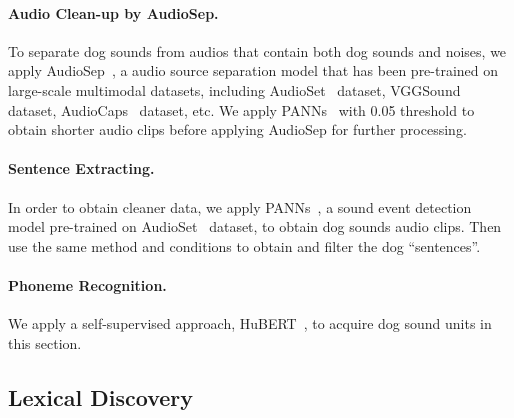 \paragraph{Audio Clean-up by AudioSep.} To separate dog sounds from audios that contain both dog sounds and noises, we apply AudioSep~\citep{liu2023separate}, a audio source separation model that has been pre-trained on large-scale multimodal datasets, including AudioSet~\citep{gemmeke2017audio} dataset, VGGSound~\citep{chen2020vggsound} dataset, AudioCaps~\citep{kim2019audiocaps} dataset, etc. We apply PANNs~\citep{kong2020panns} with 0.05 threshold to obtain shorter audio clips before applying AudioSep for further processing.

\paragraph{Sentence Extracting.} In order to obtain cleaner data, we apply PANNs~\citep{kong2020panns}, a sound event detection model pre-trained on AudioSet~\citep{gemmeke2017audio} dataset, to obtain dog sounds audio clips. Then use the same method and conditions to obtain and filter the dog ``sentences''.

\paragraph{Phoneme Recognition.} We apply a self-supervised approach, HuBERT~\citep{hsu2021hubert}, to acquire dog sound units in this section.

\subsection{Lexical Discovery}

